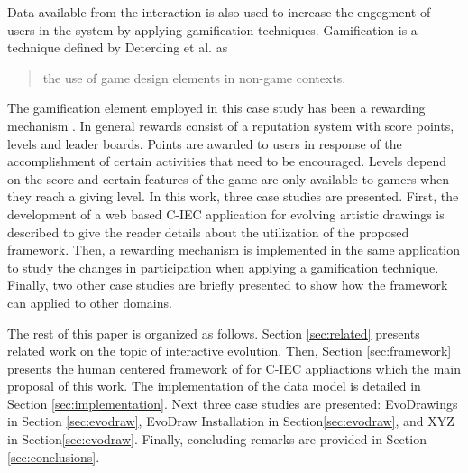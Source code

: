Data available from the interaction is also used to increase the engegment of 
users in the system by applying  gamification techniques. Gamification
is a technique defined by 
Deterding et al. \cite{deterding2011game} as
\begin{quote}
  the use of game design elements in non-game contexts.
\end{quote}  
The gamification element employed in this case study has been a rewarding mechanism  
\cite{dubois2013understanding}. In general rewards  consist of a reputation system 
with score points, levels and leader boards. Points are awarded to users in response of 
the accomplishment of certain activities that need to be encouraged. Levels depend
on the score and certain features of the game are only available to gamers when 
they reach a giving level. %
In this work, three case studies are presented. First, the development of a web based C-IEC application 
for evolving artistic drawings is described to give the reader details about 
the utilization of the proposed framework. Then, a rewarding mechanism is 
implemented in the same application to study the changes in participation
when applying a gamification technique. Finally, two other case studies are briefly presented
to show how the framework can applied to other domains. %

The rest of this paper is organized as follows.
Section \ref{sec:related} presents related work on the topic 
of interactive evolution. Then, Section \ref{sec:framework} presents the human centered framework of
for C-IEC appliactions which the main proposal of this work. The implementation of the data model
is detailed in Section \ref{sec:implementation}. %
Next three case studies are presented: EvoDrawings in
Section \ref{sec:evodraw}, EvoDraw Installation in Section\ref{sec:evodraw}, 
and XYZ in Section\ref{sec:evodraw}. Finally, concluding remarks are provided 
in Section \ref{sec:conclusions}.

